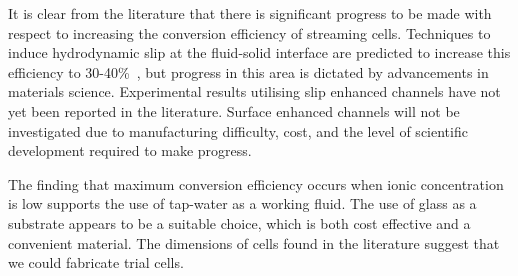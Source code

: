   It is clear from the literature that there is significant progress to be made with respect to increasing the conversion efficiency of streaming cells.
  Techniques to induce hydrodynamic slip at the fluid-solid interface are predicted to increase this efficiency to 30-40\%~\cite{Davidson2008a, Ren2008}, but progress in this area is dictated by advancements in materials science.
  Experimental results utilising slip enhanced channels have not yet been reported in the literature.
  Surface enhanced channels will not be investigated due to manufacturing difficulty, cost, and the level of scientific development required to make progress.

  The finding that maximum conversion efficiency occurs when ionic concentration is low supports the use of tap-water as a working fluid.
  The use of glass as a substrate appears to be a suitable choice, which is both cost effective and a convenient material.
  The dimensions of cells found in the literature suggest that we could fabricate trial cells.